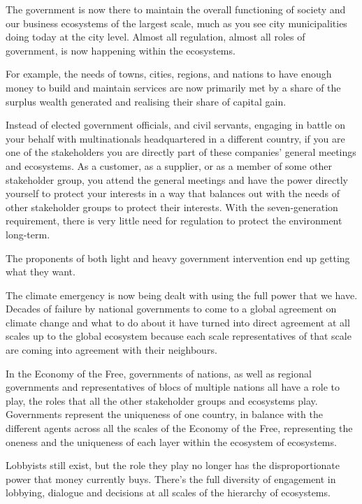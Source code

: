 The government is now there to maintain the overall functioning of society and our business ecosystems of the largest scale, much as you see city municipalities doing today at the city level. Almost all regulation, almost all roles of government, is now happening within the ecosystems.


For example, the needs of towns, cities, regions, and nations to have enough money to build and maintain services are now primarily met by a share of the surplus wealth generated and realising their share of capital gain.


Instead of elected government officials, and civil servants, engaging in battle on your behalf with multinationals headquartered in a different country, if you are one of the stakeholders you are directly part of these companies’ general meetings and ecosystems. As a customer, as a supplier, or as a member of some other stakeholder group, you attend the general meetings and have the power directly yourself to protect your interests in a way that balances out with the needs of other stakeholder groups to protect their interests. With the seven-generation requirement, there is very little need for regulation to protect the environment long-term.


The proponents of both light and heavy government intervention end up getting what they want.


The climate emergency is now being dealt with using the full power that we have. Decades of failure by national governments to come to a global agreement on climate change and what to do about it have turned into direct agreement at all scales up to the global ecosystem because each scale representatives of that scale are coming into agreement with their neighbours.


In the Economy of the Free, governments of nations, as well as regional governments and representatives of blocs of multiple nations all have a role to play, the roles that all the other stakeholder groups and ecosystems play. Governments represent the uniqueness of one country, in balance with the different agents across all the scales of the Economy of the Free, representing the oneness and the uniqueness of each layer within the ecosystem of ecosystems.


Lobbyists still exist, but the role they play no longer has the disproportionate power that money currently buys. There's the full diversity of engagement in lobbying, dialogue and decisions at all scales of the hierarchy of ecosystems.
